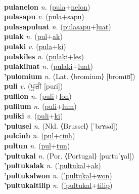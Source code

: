 \label{pulalon} \\
\textbf{pulanelon} \textit{n.} (\hyperref[pula]{pula}+\hyperref[nelon]{nelon})
 \label{pulanelon} \\
\textbf{pulasapu} \textit{v.} (\hyperref[pula]{pula}+\hyperref[sapu]{sapu})
 \label{pulasapu} \\
\textbf{pulasapuluat} \textit{n.} (\hyperref[pulasapu]{pulasapu}+\hyperref[luat]{luat})
 \label{pulasapuluat} \\
\textbf{pulak} \textit{n.} (\hyperref[pul]{pul}+\hyperref[ak]{ak})
 \label{pulak} \\
\textbf{pulaki} \textit{v.} (\hyperref[pula]{pula}+\hyperref[ki]{ki})
 \label{pulaki} \\
\textbf{pulakiles} \textit{n.} (\hyperref[pulaki]{pulaki}+\hyperref[les]{les})
 \label{pulakiles} \\
\textbf{pulakiluat} \textit{n.} (\hyperref[pulaki]{pulaki}+\hyperref[luat]{luat})
 \label{pulakiluat} \\
\textbf{'pulomium} \textit{n.} (Lat. ⟨bromium⟩ [bromɪʊ̃])
 \label{'pulomium} \\
\textbf{puli} \textit{v.} ({\gurmukhi{}ਪੂਰੀ} [puɾi])
 \label{puli} \\
\textbf{pulilon} \textit{n.} (\hyperref[puli]{puli}+\hyperref[lon]{lon})
 \label{pulilon} \\
\textbf{pulilum} \textit{n.} (\hyperref[puli]{puli}+\hyperref[lum]{lum})
 \label{pulilum} \\
\textbf{puliki} \textit{v.} (\hyperref[puli]{puli}+\hyperref[ki]{ki})
 \label{puliki} \\
\textbf{'pulusel} \textit{n.} (Nld. ⟨Brussel⟩ [ˈbrʏsəl])
 \label{'pulusel} \\
\textbf{pulciuh} \textit{n.} (\hyperref[pul]{pul}+\hyperref[ciuh]{ciuh})
 \label{pulciuh} \\
\textbf{pultun} \textit{n.} (\hyperref[pul]{pul}+\hyperref[tun]{tun})
 \label{pultun} \\
\textbf{'pultukal} \textit{n.} (Por. ⟨Portugal⟩ [puɾtuˈɣal])
 \label{'pultukal} \\
\textbf{'pultukalak} \textit{n.} (\hyperref['pultukal]{'pultukal}+\hyperref[ak]{ak})
 \label{'pultukalak} \\
\textbf{'pultukalwon} \textit{n.} (\hyperref['pultukal]{'pultukal}+\hyperref[won]{won})
 \label{'pultukalwon} \\
\textbf{'pultukaltilip} \textit{n.} (\hyperref['pultukal]{'pultukal}+\hyperref[tilip]{tilip})
 \label{'pultukaltilip} \\
